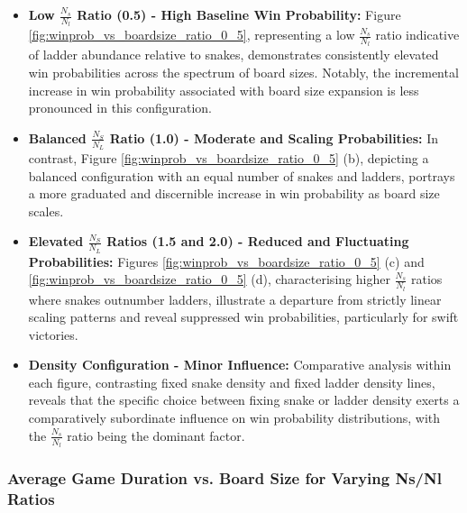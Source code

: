 \begin{itemize}
	\item \textbf{Low $\frac{N_s}{N_l}$ Ratio (0.5) - High Baseline Win Probability:} Figure \ref{fig:winprob_vs_boardsize_ratio_0_5}, representing a low $\frac{N_s}{N_l}$ ratio indicative of ladder abundance relative to snakes, demonstrates consistently elevated win probabilities across the spectrum of board sizes. Notably, the incremental increase in win probability associated with board size expansion is less pronounced in this configuration. 
	\item \textbf{Balanced $\frac{N_S}{N_L}$ Ratio (1.0) - Moderate and Scaling Probabilities:} In contrast, Figure \ref{fig:winprob_vs_boardsize_ratio_0_5} (b), depicting a balanced configuration with an equal number of snakes and ladders, portrays a more graduated and discernible increase in win probability as board size scales. 
	\item \textbf{Elevated $\frac{N_S}{N_L}$ Ratios (1.5 and 2.0) - Reduced and Fluctuating Probabilities:} Figures \ref{fig:winprob_vs_boardsize_ratio_0_5} (c) and \ref{fig:winprob_vs_boardsize_ratio_0_5} (d), characterising higher $\frac{N_s}{N_l}$ ratios where snakes outnumber ladders, illustrate a departure from strictly linear scaling patterns and reveal suppressed win probabilities, particularly for swift victories.
	\item \textbf{Density Configuration - Minor Influence:} Comparative analysis within each figure, contrasting fixed snake density and fixed ladder density lines, reveals that the specific choice between fixing snake or ladder density exerts a comparatively subordinate influence on win probability distributions, with the $\frac{N_s}{N_l}$ ratio being the dominant factor.
\end{itemize}


\subsubsection{Average Game Duration vs. Board Size for Varying Ns/Nl Ratios}

